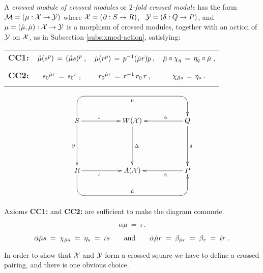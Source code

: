 \begin{defn}  
A \emph{crossed module of crossed modules} 
or \emph{$2$-fold crossed module}  has the form 
$\mathcal{M} = (\mu : \mathcal{X} \to \mathcal{Y})$
where  $\mathcal{X} = (\partial : S \to R)$,~ $\mathcal{Y} = (\delta : Q \to P)$,
and $\mu = (\ddot{\mu},\dot{\mu}) : \mathcal{X} \to \mathcal{Y}$
is a morphism of crossed modules, 
together with an action of  $\mathcal{Y}$  on  $\mathcal{X}$,  
as in Subsection \ref{subs:xmod-action}, satisfying:

\begin{center}
\begin{tabular}{rccc}
{\bf CC1:}\quad  &
 $\ddot{\mu}({s}^p) \,=\, (\ddot{\mu} s)^p\,$, &
  $\dot{\mu}({r}^p) \,=\, p^{-1}(\dot{\mu} r)p\,$,  &
  $\ddot{\mu} \circ \chi_q \,=\, \eta_q\circ \dot{\mu}\,$, \\
 & & \\
{\bf CC2:}\quad  &
  ${s_0}^{\dot{\mu} r} \,=\, {s_0}^r\,$, &
  ${r_0}^{\dot{\mu} r} \,=\, r^{-1}\,r_0\,r\,$, &
  $\chi_{\ddot{\mu} s} \,=\, \eta_s\,$. \\
 & & \\
\end{tabular}
\end{center}
\end{defn}
\begin{equation} \label{eq:xxsq}
\vcenter{\xymatrix{ 
     &&  && \\
  S \ar[rr]^(0.4){\ddi} \ar[dd]_{\partial}
    \ar `u[-1,1] `[0,4]_{\ddm} [0,4]
     && W(\calX) \ar[dd]^{\Delta}
     && Q \ar[ll]_(0.4){\dda} \ar[dd]^{\delta}  \\
     &&  &&  \\
  R \ar[rr]_(0.4){\di}
    \ar `d[1,1] `[0,4]^{\dm} [0,4]
     && A(\calX) 
     && P \ar[ll]^(0.4){\da} \\
     &&  &&
}} 
\end{equation}

\bigskip\noindent
Axioms \textbf{CC1:} and \textbf{CC2:} are sufficient 
to make the diagram commute.

\begin{lem}
$$
\alpha\mu ~=~ \iota\,.
$$
\end{lem}
\begin{pf}
$$
\ddot{\alpha}\ddot{\mu} s \;=\;
\chi_{\ddot{\mu} s} \;=\; \eta_s \;=\; \ddot{\iota} s
\qquad\mbox{and}\qquad  
\dot{\alpha}\dot{\mu} r \;=\;
\beta_{\dot{\mu} r} \;=\; \beta_r \;=\; \dot{\iota} r~.
$$
\end{pf}

\bigskip\noindent
In order to show that $\mathcal{X}$ and $\mathcal{Y}$ form a crossed square 
we have to define a crossed pairing, 
and there is one obvious choice.


